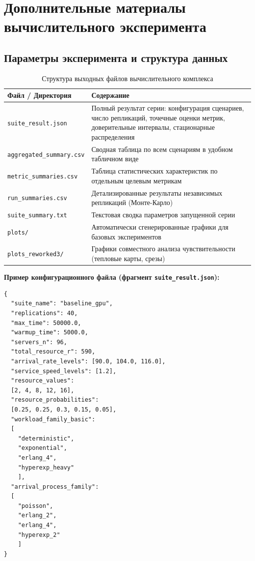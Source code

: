 \chapter{Дополнительные материалы вычислительного эксперимента}
\label{app:additional_materials}

\section{Параметры эксперимента и структура данных}
\label{app:params}

\begin{table}[H]
\centering
\caption{Структура выходных файлов вычислительного комплекса}
\label{tab:output_files}
\begin{tabularx}{\textwidth}{|l|X|}
\hline
\textbf{Файл / Директория} & \textbf{Содержание} \\ \hline
\texttt{suite\_result.json} & Полный результат серии: конфигурация сценариев, число репликаций, точечные оценки метрик, доверительные интервалы, стационарные распределения \\ \hline
\texttt{aggregated\_summary.csv} & Сводная таблица по всем сценариям в удобном табличном виде \\ \hline
\texttt{metric\_summaries.csv} & Таблица статистических характеристик по отдельным целевым метрикам \\ \hline
\texttt{run\_summaries.csv} & Детализированные результаты независимых репликаций (Монте-Карло) \\ \hline
\texttt{suite\_summary.txt} & Текстовая сводка параметров запущенной серии \\ \hline
\texttt{plots/} & Автоматически сгенерированные графики для базовых экспериментов \\ \hline
\texttt{plots\_reworked3/} & Графики совместного анализа чувствительности (тепловые карты, срезы) \\ \hline
\end{tabularx}
\end{table}

\textbf{Пример конфигурационного файла (фрагмент \texttt{suite\_result.json}):}
\begin{verbatim}
{
  "suite_name": "baseline_gpu",
  "replications": 40,
  "max_time": 50000.0,
  "warmup_time": 5000.0,
  "servers_n": 96,
  "total_resource_r": 590,
  "arrival_rate_levels": [90.0, 104.0, 116.0],
  "service_speed_levels": [1.2],
  "resource_values": 
  [2, 4, 8, 12, 16],
  "resource_probabilities": 
  [0.25, 0.25, 0.3, 0.15, 0.05],
  "workload_family_basic": 
  [
    "deterministic", 
    "exponential", 
    "erlang_4", 
    "hyperexp_heavy"
    ],
  "arrival_process_family": 
  [
    "poisson", 
    "erlang_2", 
    "erlang_4", 
    "hyperexp_2"
    ]
}
\end{verbatim}

